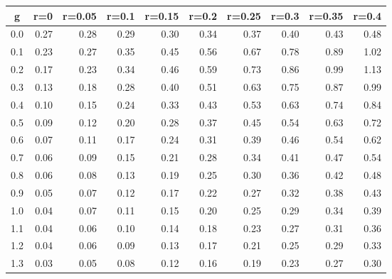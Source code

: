 %
\begin{table}[!tbp]
 \begin{center}
 \begin{tabular}{rrrrrrrrrr}\hline\hline
\multicolumn{1}{c}{g}&\multicolumn{1}{c}{r=0}&\multicolumn{1}{c}{r=0.05}&\multicolumn{1}{c}{r=0.1}&\multicolumn{1}{c}{r=0.15}&\multicolumn{1}{c}{r=0.2}&\multicolumn{1}{c}{r=0.25}&\multicolumn{1}{c}{r=0.3}&\multicolumn{1}{c}{r=0.35}&\multicolumn{1}{c}{r=0.4}\tabularnewline
\hline
0.0&0.27&0.28&0.29&0.30&0.34&0.37&0.40&0.43&0.48\tabularnewline
0.1&0.23&0.27&0.35&0.45&0.56&0.67&0.78&0.89&1.02\tabularnewline
0.2&0.17&0.23&0.34&0.46&0.59&0.73&0.86&0.99&1.13\tabularnewline
0.3&0.13&0.18&0.28&0.40&0.51&0.63&0.75&0.87&0.99\tabularnewline
0.4&0.10&0.15&0.24&0.33&0.43&0.53&0.63&0.74&0.84\tabularnewline
0.5&0.09&0.12&0.20&0.28&0.37&0.45&0.54&0.63&0.72\tabularnewline
0.6&0.07&0.11&0.17&0.24&0.31&0.39&0.46&0.54&0.62\tabularnewline
0.7&0.06&0.09&0.15&0.21&0.28&0.34&0.41&0.47&0.54\tabularnewline
0.8&0.06&0.08&0.13&0.19&0.25&0.30&0.36&0.42&0.48\tabularnewline
0.9&0.05&0.07&0.12&0.17&0.22&0.27&0.32&0.38&0.43\tabularnewline
1.0&0.04&0.07&0.11&0.15&0.20&0.25&0.29&0.34&0.39\tabularnewline
1.1&0.04&0.06&0.10&0.14&0.18&0.23&0.27&0.31&0.36\tabularnewline
1.2&0.04&0.06&0.09&0.13&0.17&0.21&0.25&0.29&0.33\tabularnewline
1.3&0.03&0.05&0.08&0.12&0.16&0.19&0.23&0.27&0.30\tabularnewline
\hline
\end{tabular}

\end{center}

\end{table}

